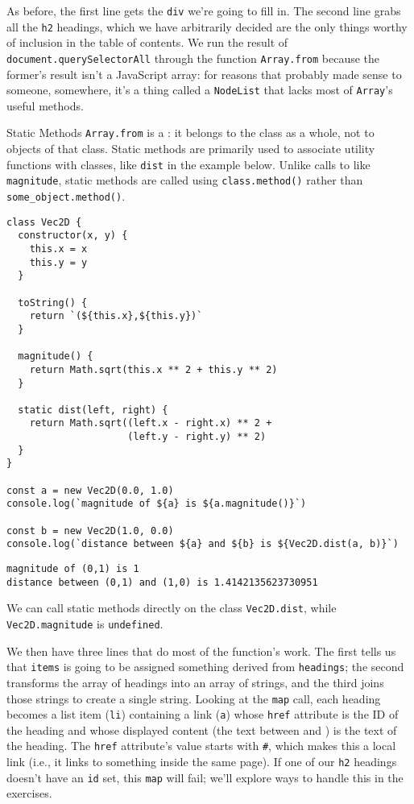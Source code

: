 As before,
the first line gets the \texttt{div} we're going to fill in.
The second line grabs all the \texttt{h2} headings,
which we have arbitrarily decided are the only things worthy of inclusion
in the table of contents.
We run the result of \texttt{document.querySelectorAll}
through the function \texttt{Array.from}
because the former's result isn't a JavaScript array:
for reasons that probably made sense to someone, somewhere,
it's a thing called a \texttt{NodeList}
that lacks most of \texttt{Array}'s useful methods.

\begin{aside}{Static Methods}
  \texttt{Array.from} is a :
  it belongs to the class as a whole,
  not to objects of that class.
  Static methods are primarily used to associate utility functions with classes,
  like \texttt{dist} in the example below.
  Unlike calls to  like \texttt{magnitude},
  static methods are called using \texttt{class.method()}
  rather than \texttt{some\_object.method()}.

\begin{verbatim}
class Vec2D {
  constructor(x, y) {
    this.x = x
    this.y = y
  }

  toString() {
    return `(${this.x},${this.y})`
  }

  magnitude() {
    return Math.sqrt(this.x ** 2 + this.y ** 2)
  }

  static dist(left, right) {
    return Math.sqrt((left.x - right.x) ** 2 +
                     (left.y - right.y) ** 2)
  }
}

const a = new Vec2D(0.0, 1.0)
console.log(`magnitude of ${a} is ${a.magnitude()}`)

const b = new Vec2D(1.0, 0.0)
console.log(`distance between ${a} and ${b} is ${Vec2D.dist(a, b)}`)
\end{verbatim}

\begin{verbatim}
magnitude of (0,1) is 1
distance between (0,1) and (1,0) is 1.4142135623730951
\end{verbatim}

We can call static methods directly on the class \texttt{Vec2D.dist},
while \texttt{Vec2D.magnitude} is \texttt{undefined}.
\end{aside}

We then have three lines that do most of the function's work.
The first tells us that \texttt{items} is going to be assigned
something derived from \texttt{headings};
the second transforms the array of headings into an array of strings,
and the third joins those strings to create a single string.
Looking at the \texttt{map} call,
each heading becomes a list item (\texttt{li})
containing a link (\texttt{a})
whose \texttt{href} attribute is the ID of the heading
and whose displayed content (the text between \texttt{} and \texttt{})
is the text of the heading.
The \texttt{href} attribute's value starts with \texttt{\#},
which makes this a local link
(i.e., it links to something inside the same page).
If one of our \texttt{h2} headings doesn't have an \texttt{id} set,
this \texttt{map} will fail;
we'll explore ways to handle this in the exercises.

